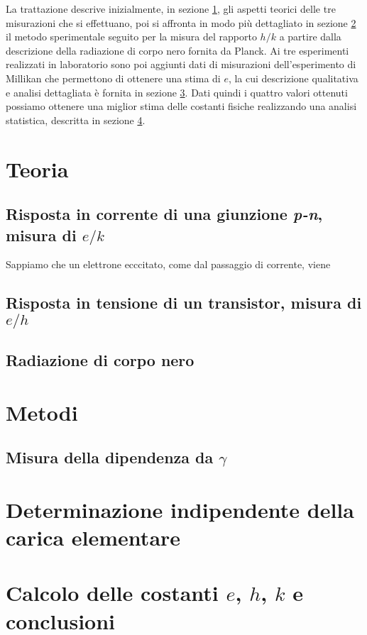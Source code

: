 \documentclass[a4paper, varvw, nofootinbib]{revtex4-2}
\begin{document}
La trattazione descrive inizialmente, in sezione \ref{sec:theory}, gli aspetti teorici delle tre misurazioni che si effettuano, poi si affronta in modo più dettagliato in sezione \ref{sec:black_body_methods} il metodo sperimentale seguito per la misura del rapporto $h/k$ a partire dalla descrizione della radiazione di corpo nero fornita da Planck. Ai tre esperimenti realizzati in laboratorio sono poi aggiunti dati di misurazioni dell'esperimento di Millikan che permettono di ottenere una stima di $e$, la cui descrizione qualitativa e analisi dettagliata è fornita in sezione \ref{sec:millikan}. Dati quindi i quattro valori ottenuti possiamo ottenere una miglior stima delle costanti fisiche realizzando una analisi statistica, descritta in sezione \ref{sec:combined_data}. 

\section{Teoria}\label{sec:theory}



\subsection{Risposta in corrente di una giunzione \emph{p-n}, misura di $e/k$}

Sappiamo che un elettrone ecccitato, come dal passaggio di corrente, viene 

\subsection{Risposta in tensione di un transistor, misura di $e/h$}

\subsection{Radiazione di corpo nero}

\section{Metodi}\label{sec:black_body_methods}

\subsection{Misura della dipendenza da $\gamma$}

\section{Determinazione indipendente della carica elementare}\label{sec:millikan}

\section{Calcolo delle costanti $e$, $h$, $k$ e conclusioni}\label{sec:combined_data}


\end{document}
